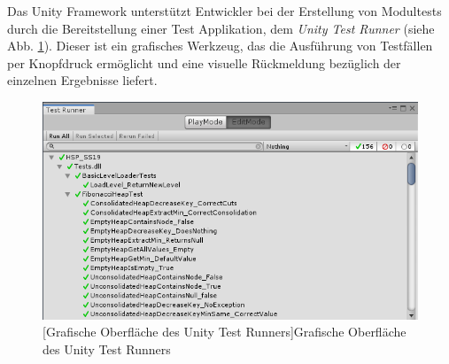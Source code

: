 

Das Unity Framework unterstützt Entwickler bei der Erstellung von Modultests durch die Bereitstellung einer Test Applikation, dem \textit{Unity Test Runner} (siehe Abb. \ref{fig:unity_test_runner}). Dieser ist ein grafisches Werkzeug, das die Ausführung von Testfällen per Knopfdruck ermöglicht und eine visuelle Rückmeldung bezüglich der einzelnen Ergebnisse liefert. 

      \begin{figure}[!t]
      \begin{center}
		\includegraphics[width=1.00\linewidth]{pics/unity_test_runner.png}
		[Grafische Oberfläche des Unity Test Runners]{Grafische Oberfläche des Unity Test Runners}
		\label{fig:unity_test_runner}
		  \end{center}
		\end{figure}

